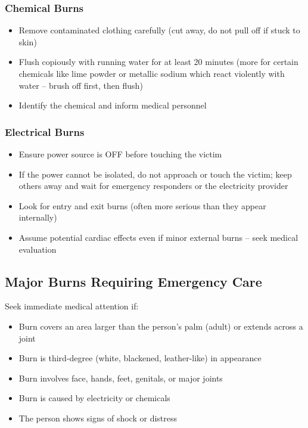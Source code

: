 \subsubsection{Chemical Burns}

\begin{itemize}[leftmargin=*]
  \item Remove contaminated clothing carefully (cut away, do not pull off if stuck to skin)
  \item Flush copiously with running water for at least 20 minutes (more for certain chemicals like lime powder or metallic sodium which react violently with water -- brush off first, then flush)
  \item Identify the chemical and inform medical personnel
\end{itemize}

\subsubsection{Electrical Burns}

\begin{itemize}[leftmargin=*]
  \item Ensure power source is OFF before touching the victim
  \item If the power cannot be isolated, do not approach or touch the victim; keep others away and wait for emergency responders or the electricity provider
  \item Look for entry and exit burns (often more serious than they appear internally)
  \item Assume potential cardiac effects even if minor external burns -- seek medical evaluation
\end{itemize}

\subsection{Major Burns Requiring Emergency Care}

Seek immediate medical attention if:

\begin{itemize}[leftmargin=*]
  \item Burn covers an area larger than the person's palm (adult) or extends across a joint
  \item Burn is third-degree (white, blackened, leather-like) in appearance
  \item Burn involves face, hands, feet, genitals, or major joints
  \item Burn is caused by electricity or chemicals
  \item The person shows signs of shock or distress
\end{itemize}

